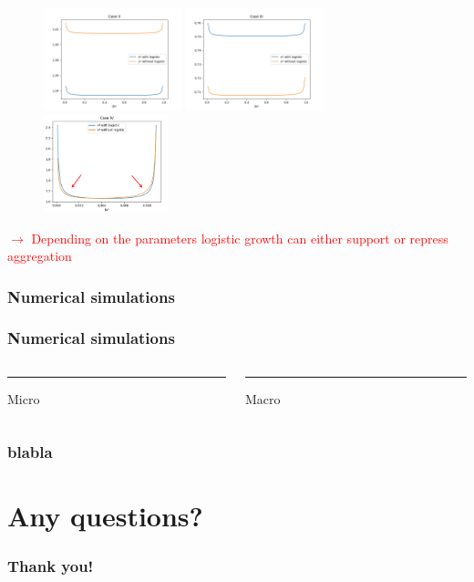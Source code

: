 \documentclass[10pt]{beamer}
\theoremstyle{remark}
\begin{document}
\begin{frame}
\begin{figure}
\includegraphics[width=4cm]{sstar_caseII}
\includegraphics[width=4cm]{sstar_caseIII}
\includegraphics[width=3.6cm]{caseIVmodi}

\end{figure}


\textcolor{red}{$\rightarrow$ Depending on the parameters logistic growth can either support or repress aggregation}



\end{frame}




\begin{frame}
\frametitle{Numerical simulations}
\end{frame}


\begin{frame}
\frametitle{Numerical simulations}
\begin{columns}[T] %
	\begin{column}{.48\textwidth}
		\color{orange}\rule{\linewidth}{4pt}
		
		Micro
	\end{column}%
	\hfill%
	\begin{column}{.48\textwidth}
		\color{blue}\rule{\linewidth}{4pt}
		
		Macro
	\end{column}%
\end{columns}
\end{frame}

\begin{frame}
\frametitle{blabla}
\end{frame}




\section{Any questions?}
\begin{frame}
\frametitle{Thank you!}
\end{frame}
\end{document}
